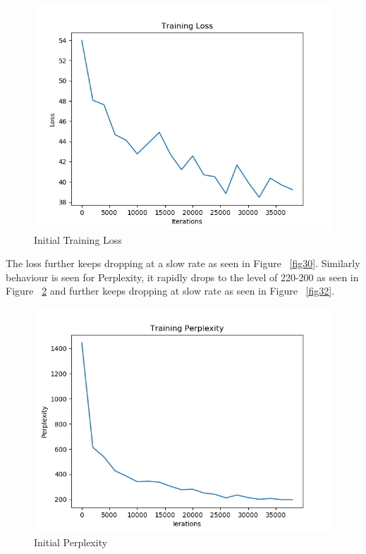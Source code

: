 \documentclass[11pt,a4paper]{article}
\begin{document}
\begin{figure}[!htbp]
\includegraphics[width=\linewidth]{de_key-value_loss_1.png}
\caption{Initial Training Loss}
\label{fig29}
\end{figure}



The loss further keeps dropping at a slow rate as seen in Figure ~\ref{fig30}. Similarly behaviour is seen for Perplexity, it rapidly drops to the level of 220-200 as seen in Figure ~\ref{fig31} and further keeps dropping at slow rate as seen in Figure ~\ref{fig32}.


\begin{figure}[!htbp]
\includegraphics[width=\linewidth]{de_key-value_ppl_1.png}
\caption{Initial Perplexity}
\label{fig31}
\end{figure}
\end{document}
